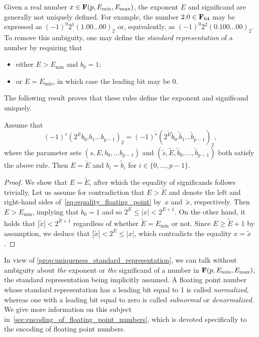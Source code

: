 Given a real number $x \in \mathbf F (p, E_{\min}, E_{\max})$,
the exponent $E$ and significand  are generally not uniquely defined.
For example, the number $2.0 \in \mathbf F_{64}$ may be expressed as $(-1)^0 2^1 (1.00\dots00)_2$ or, equivalently, as $(-1)^0 2^{2} (0.100\dots00)_2$.
To remove this ambiguity,
one may define the \emph{standard representation} of a number by requiring that
\begin{itemize}
    \item either $E > E_{\min}$ and $b_0 = 1$;
    \item or $E = E_{\min}$, in which case the leading bit may be 0.
\end{itemize}
The following result proves that these rules define the exponent and significand uniquely.
\begin{proposition}
    \label{prop:uniqueness_standard_representation}
    Assume that
    \begin{equation}
        \label{eq:equality_floating_point}
        (-1)^s (2^{E} b_0.b_1\dots b_{p-1})_2 = (-1)^{\widetilde s} (2^{\widetilde E} \widetilde b_0. \widetilde b_1\dots \widetilde b_{p-1})_2,
    \end{equation}
    where the parameter sets $(s, E, b_0, \dots b_{p-1})$ and $(\widetilde s, \widetilde E, \widetilde b_0, \dots, \widetilde b_{p-1})$ both satisfy the above rule.
    Then $E = \widetilde E$ and $b_i = \widetilde b_i$ for $i \in \{0, \dots, p-1\}$.
\end{proposition}
\begin{proof}
    We show that $E = \widetilde E$,
    after which the equality of significands follows trivially,
    Let us assume for contradiction that $E > \widetilde E$
    and denote the left and right-hand sides of~\eqref{eq:equality_floating_point} by~$x$ and~$\widetilde x$, respectively.
    Then~$E > E_{\min}$, implying that $b_0 = 1$ and so $2^{E} \leq |x| < 2^{E+1}$.
    On the other hand, it holds that $|\widetilde x| < 2^{\widetilde E+1}$ regardless of whether $\widetilde E = E_{\min}$ or not.
    Since $E \geq \widetilde E + 1$ by assumption,
    we deduce that $|\widetilde x| < 2^E \leq |x|$,
    which contradicts the equality $x = \widetilde x$.
\end{proof}

In view of \cref{prop:uniqueness_standard_representation},
we can talk without ambiguity about \emph{the} exponent or \emph{the} significand of a number in $\mathbf F (p, E_{\min}, E_{\max})$,
the standard representation being implicitly assumed.
A floating point number whose standard representation has a leading bit equal to 1 is called \emph{normalized},
whereas one with a leading bit equal to zero is called \emph{subnormal} or \emph{denormalized}.
We give more information on this subject in~\cref{sec:encoding_of_floating_point_numbers},
which is devoted specifically to the encoding of floating point numbers.

